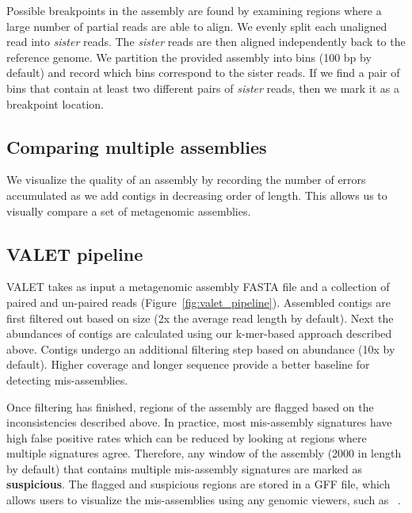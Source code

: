 \documentclass{bioinfo}
\begin{document}
Possible breakpoints in the assembly are found by examining regions where a large number of partial reads are able to align.
We evenly split each unaligned read into \emph{sister} reads.
The \emph{sister} reads are then aligned independently back to the reference genome.
We partition the provided assembly into bins (100 bp by default) and record which bins correspond to the sister reads.
If we find a pair of bins that contain at least two different pairs of \textit{sister} reads, then we mark it as a breakpoint location.

\subsection{Comparing multiple assemblies}

We visualize the quality of an assembly by recording the number of errors accumulated as we add contigs in decreasing order of length.
This allows us to visually compare a set of metagenomic assemblies.

\subsection{VALET pipeline}

VALET takes as input a metagenomic assembly \textsc{FASTA} file and a collection of paired and un-paired reads (Figure~\ref{fig:valet_pipeline}).
Assembled contigs are first filtered out based on size (2x the average read length by default).
Next the abundances of contigs are calculated using our k-mer-based approach described above.
Contigs undergo an additional filtering step based on abundance (10x by default).
Higher coverage and longer sequence provide a better baseline for detecting mis-assemblies.

Once filtering has finished, regions of the assembly are flagged based on the inconsistencies described above.
In practice, most mis-assembly signatures have high false positive rates which can be reduced by looking at regions where multiple signatures agree.
Therefore, any window of the assembly (2000 in length by default) that contains multiple mis-assembly signatures are marked as \textbf{suspicious}.
The flagged and suspicious regions are stored in a \textsc{GFF} file, which allows users to visualize the mis-assemblies using any genomic viewers, such as ~\citep{thorvaldsdottir2012integrative}.
\end{document}
